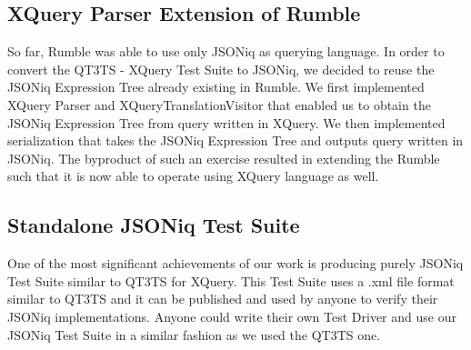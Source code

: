 \subsection{XQuery Parser Extension of Rumble}
So far, Rumble was able to use only JSONiq as querying language. In order to convert the QT3TS - XQuery Test Suite to JSONiq, we decided to reuse the JSONiq Expression Tree already existing in Rumble. We first implemented XQuery Parser and XQueryTranslationVisitor that enabled us to obtain the JSONiq Expression Tree from query written in XQuery. We then implemented serialization that takes the JSONiq Expression Tree and outputs query written in JSONiq. The byproduct of such an exercise resulted in extending the Rumble such that it is now able to operate using XQuery language as well.

\subsection{Standalone JSONiq Test Suite}
One of the most significant achievements of our work is producing purely JSONiq Test Suite similar to QT3TS for XQuery. This Test Suite uses a .xml file format similar to QT3TS and it can be published and used by anyone to verify their JSONiq implementations. Anyone could write their own Test Driver and use our JSONiq Test Suite in a similar fashion as we used the QT3TS one.


